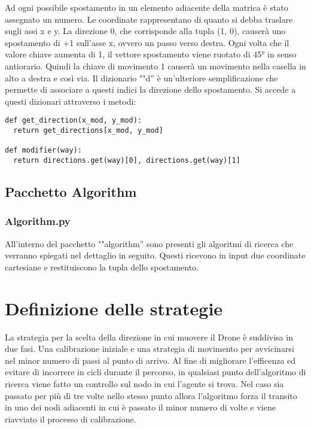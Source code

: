 Ad ogni possibile spostamento in un elemento adiacente della matrica è stato assegnato un numero. Le coordinate rappresentano di quanto si debba traslare sugli assi x e y. La direzione 0, che corrisponde alla tupla (1, 0), causerà uno spostamento di +1 sull'asse x, ovvero un passo verso destra. Ogni volta che il valore chiave aumenta di 1, il vettore spostamento viene ruotato di 45° in senso antiorario. Quindi la chiave di movimento 1 causerà un movimento nella casella in alto a destra e così via. Il dizionario ""d'' è un'ulteriore semplificazione che permette di associare a questi indici la direzione dello spostamento. Si accede a questi dizionari attraverso i metodi:
\begin{verbatim}
def get_direction(x_mod, y_mod):
  return get_directions[x_mod, y_mod]

def modifier(way):
  return directions.get(way)[0], directions.get(way)[1]

\end{verbatim}

\subsection{Pacchetto Algorithm}

\subsubsection{Algorithm.py}
All'interno del pacchetto ""algorithm'' sono presenti gli algoritmi di ricerca che verranno spiegati nel dettaglio in seguito. Questi ricevono in input due coordinate cartesiane e restituiscono la tupla dello spostamento.
	
\section{Definizione delle strategie}
La strategia per la scelta della direzione in cui muovere il Drone è suddivisa in due fasi. Una calibrazione iniziale e una strategia di movimento per avvicinarsi nel minor numero di passi al punto di arrivo. Al fine di migliorare l'efficenza ed evitare di incorrere in cicli durante il percorso, in qualsiasi punto dell'algoritmo di ricerca viene fatto un controllo sul nodo in cui l'agente si trova. Nel caso sia passato per più di tre volte nello stesso punto allora l'algoritmo forza il transito in uno dei nodi adiacenti in cui è passato il minor numero di volte e viene riavviato il processo di calibrazione.

